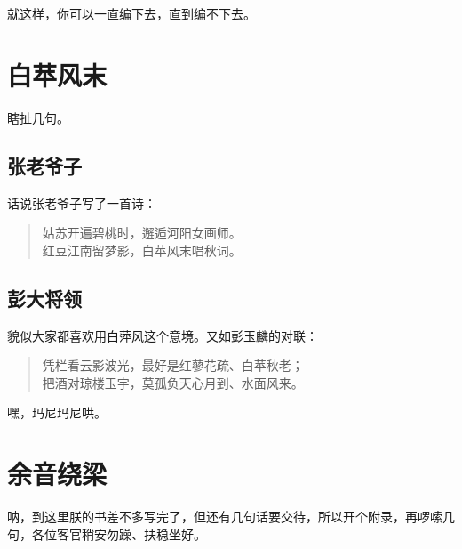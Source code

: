 \documentclass[]{ctexbook}
\theoremstyle{definition}
\theoremstyle{definition}
\theoremstyle{definition}
\theoremstyle{remark}
\begin{document}
就这样，你可以一直编下去，直到编不下去。

\hypertarget{wind}{%
\chapter{白苹风末}\label{wind}}

瞎扯几句。

\section{张老爷子}

话说张老爷子写了一首诗：

\begin{quote}
姑苏开遍碧桃时，邂逅河阳女画师。\\
红豆江南留梦影，白苹风末唱秋词。
\end{quote}

\section{彭大将领}

貌似大家都喜欢用白萍风这个意境。又如彭玉麟的对联：

\begin{quote}
凭栏看云影波光，最好是红蓼花疏、白苹秋老；\\
把酒对琼楼玉宇，莫孤负天心月到、水面风来。
\end{quote}

嘿，玛尼玛尼哄。

\cleardoublepage

\hypertarget{appendix-}{%
\appendix {}}


\hypertarget{sound}{%
\chapter{余音绕梁}\label{sound}}

呐，到这里朕的书差不多写完了，但还有几句话要交待，所以开个附录，再啰嗦几句，各位客官稍安勿躁、扶稳坐好。



\backmatter
\printindex
\end{document}
